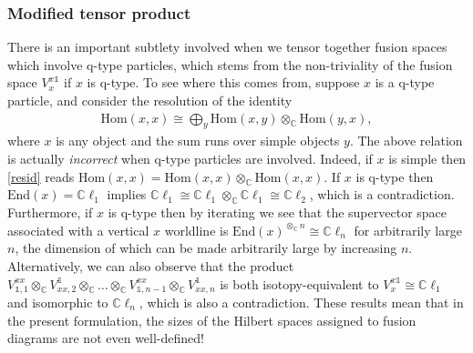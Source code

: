 \documentclass[12pt,a4paper]{article}
\newcommand{\tp}{\otimes}
\newcommand{\unit}{\mathds{1}}
\newcommand{\cc}{\mathbb{C}}
\newcommand{\Hom}{\text{Hom}}
\newcommand{\End}{\text{End}}
\newcommand{\cl}{\mathbb{C}\ell}
\begin{document}
\subsubsection{Modified tensor product}
There is an important subtlety involved when we tensor together fusion spaces which involve q-type particles, which stems from the non-triviality of the fusion space $V^{x\unit}_x$ if $x$ is q-type.
To see where this comes from, suppose $x$ is a q-type particle, and consider the resolution of the identity 
\begin{align} \label{resid}
\Hom(x,x) \cong \bigoplus_y \Hom(x,y) \tp_\cc \Hom(y,x),
\end{align}
where $x$ is any object and the sum runs over simple objects $y$. 
The above relation is actually {\it incorrect} when q-type particles are involved. 
Indeed, if $x$ is simple then \eqref{resid} reads $\Hom(x,x) = \Hom(x,x) \tp_\cc \Hom(x,x).$ 
If $x$ is q-type then $\End(x) = \cl_1$ implies $\cl_1 \cong \cl_1\tp_\cc \cl_1 \cong \cl_2$, which is a contradiction. 
Furthermore, if $x$ is q-type then by iterating we see that the supervector space associated with a vertical $x$ worldline is $\End(x)^{\tp_{\cc} n} \cong \cl_n$ for arbitrarily large $n$, the dimension of which can be made arbitrarily large by increasing $n$. 
Alternatively, we can also observe that the product $V_{\unit,1}^{xx} \tp_\cc V^\unit_{xx,2} \tp_\cc \dots \tp_\cc V_{\unit,n-1}^{xx} \tp_\cc V^\unit_{xx,n}$ is both isotopy-equivalent to $V^{x\unit}_x \cong \cl_1$ and isomorphic to $\cl_n$, which is also a contradiction. 
These results mean that in the present formulation, the sizes of the Hilbert spaces assigned to fusion diagrams are not even well-defined! 
\end{document}
